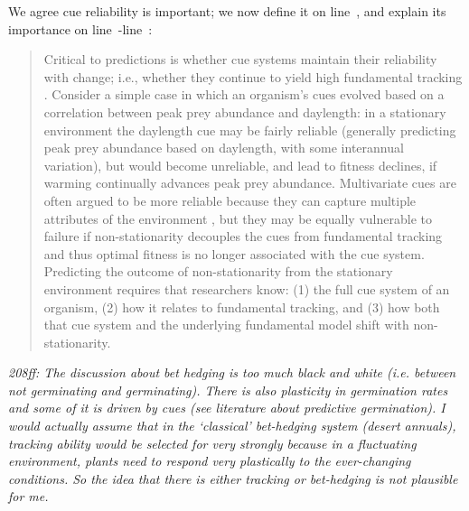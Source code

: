 \documentclass[11pt]{article}
\newcommand{\lr}[1]{line~\lineref{#1}}
\begin{document}
We agree cue reliability is important; we now define it on \lr{definecue}, and explain its importance on \lr{cuereliable}-\lr{r3birdsE}:
\begin{quote}
Critical to predictions is whether  cue systems maintain their reliability with change; i.e., whether they continue to yield high fundamental tracking \citep{bonamour2019}. Consider a simple case in which an organism's cues evolved based on a correlation between peak prey abundance and daylength: in a stationary environment the daylength cue may be fairly reliable (generally predicting peak prey abundance based on daylength, with some interannual variation), but would become unreliable, and lead to fitness declines, if warming continually advances peak prey abundance. Multivariate cues are often argued to be more reliable because they can capture multiple attributes of the environment \citep{dore2018,bonamour2019}, but they may be equally vulnerable to failure if non-stationarity decouples the cues from fundamental tracking \citep{bonamour2019} and thus optimal fitness is no longer associated with the cue system. Predicting the outcome of non-stationarity from the stationary environment requires that researchers know: (1) the full cue system of an organism, (2) how it relates to fundamental tracking, and (3) how both that cue system and the underlying fundamental model shift with non-stationarity.
\end{quote}

\emph{208ff: The discussion about bet hedging is too much black and white (i.e. between not
germinating and germinating). There is also plasticity in germination rates and some of it is
driven by cues (see literature about predictive germination). I would actually assume that in
the `classical' bet-hedging system (desert annuals), tracking ability would be selected for
very strongly because in a fluctuating environment, plants need to respond very plastically
to the ever-changing conditions. So the idea that there is either tracking or bet-hedging is
not plausible for me.}\\
\end{document}
